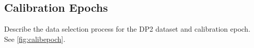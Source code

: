 

\subsection{Calibration Epochs}\label{sec:data:selection}
Describe the data selection process for the DP2 dataset and calibration epoch. See \ref{fig:calibepoch}.

